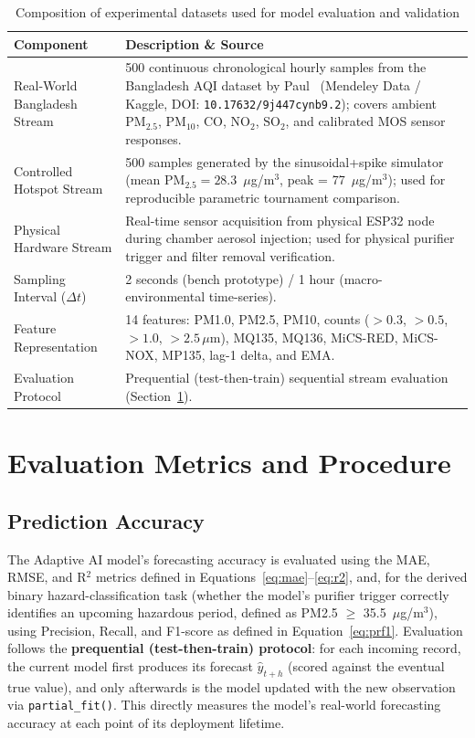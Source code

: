 \begin{table}[htbp]
\centering
\caption{Composition of experimental datasets used for model evaluation and validation}
\label{tab:exp-dataset}
\small
\begin{tabular}{@{}p{4.2cm}p{9.2cm}@{}}
\toprule
\textbf{Component} & \textbf{Description \& Source} \\
\midrule
Real-World Bangladesh Stream & 500 continuous chronological hourly samples from the Bangladesh AQI dataset by Paul~\cite{paul2026bangladesh} (Mendeley Data / Kaggle, DOI: \texttt{10.17632/9j447cynb9.2}); covers ambient $\text{PM}_{2.5}$, $\text{PM}_{10}$, $\text{CO}$, $\text{NO}_2$, $\text{SO}_2$, and calibrated MOS sensor responses. \\
Controlled Hotspot Stream & 500 samples generated by the sinusoidal+spike simulator (mean $\text{PM}_{2.5} = 28.3$~$\mu$g/m$^3$, peak = 77~$\mu$g/m$^3$); used for reproducible parametric tournament comparison. \\
Physical Hardware Stream & Real-time sensor acquisition from physical ESP32 node during chamber aerosol injection; used for physical purifier trigger and filter removal verification. \\
Sampling Interval ($\Delta t$) & 2 seconds (bench prototype) / 1 hour (macro-environmental time-series). \\
Feature Representation & 14 features: PM1.0, PM2.5, PM10, counts ($>0.3$, $>0.5$, $>1.0$, $>2.5\,\mu$m), MQ135, MQ136, MiCS-RED, MiCS-NOX, MP135, lag-1 delta, and EMA. \\
Evaluation Protocol & Prequential (test-then-train) sequential stream evaluation (Section~\ref{sec:exp-metrics-procedure}). \\
\bottomrule
\end{tabular}
\end{table}

\section{Evaluation Metrics and Procedure}
\label{sec:exp-metrics-procedure}

\subsection{Prediction Accuracy}
The Adaptive AI model's forecasting accuracy is evaluated using the MAE, RMSE, and R$^2$ metrics defined in Equations~\ref{eq:mae}--\ref{eq:r2}, and, for the derived binary hazard-classification task (whether the model's purifier trigger correctly identifies an upcoming hazardous period, defined as PM2.5 $\geq$ 35.5~$\mu$g/m$^3$), using Precision, Recall, and F1-score as defined in Equation~\ref{eq:prf1}. Evaluation follows the \textbf{prequential (test-then-train) protocol}: for each incoming record, the current model first produces its forecast $\hat{y}_{t+h}$ (scored against the eventual true value), and only afterwards is the model updated with the new observation via \texttt{partial\_fit()}. This directly measures the model's real-world forecasting accuracy at each point of its deployment lifetime.


